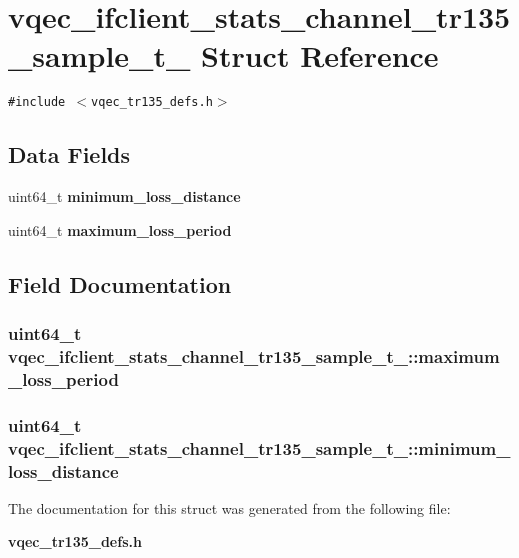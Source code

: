 \section{vqec\_\-ifclient\_\-stats\_\-channel\_\-tr135\_\-sample\_\-t\_\- Struct Reference}
\label{structvqec__ifclient__stats__channel__tr135__sample__t__}
{\tt \#include $<$vqec\_\-tr135\_\-defs.h$>$}

\subsection*{Data Fields}
\begin{CompactItemize}
\item 
uint64\_\-t \bf{minimum\_\-loss\_\-distance}
\item 
uint64\_\-t \bf{maximum\_\-loss\_\-period}
\end{CompactItemize}


\subsection{Field Documentation}
\subsubsection{\setlength{\rightskip}{0pt plus 5cm}uint64\_\-t \bf{vqec\_\-ifclient\_\-stats\_\-channel\_\-tr135\_\-sample\_\-t\_\-::maximum\_\-loss\_\-period}}\label{structvqec__ifclient__stats__channel__tr135__sample__t___a496d6252bb845bb09e089f54ac24971}


\subsubsection{\setlength{\rightskip}{0pt plus 5cm}uint64\_\-t \bf{vqec\_\-ifclient\_\-stats\_\-channel\_\-tr135\_\-sample\_\-t\_\-::minimum\_\-loss\_\-distance}}\label{structvqec__ifclient__stats__channel__tr135__sample__t___3f7404c5b30486900fead241be43ae4b}




The documentation for this struct was generated from the following file:\begin{CompactItemize}
\item 
\bf{vqec\_\-tr135\_\-defs.h}\end{CompactItemize}
